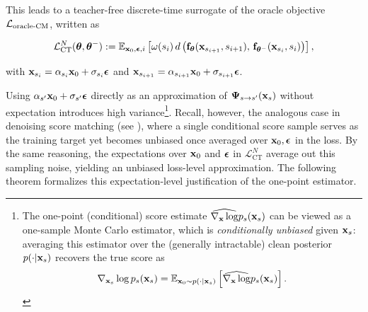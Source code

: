 This leads to a teacher-free discrete-time surrogate of the oracle objective $\mathcal{L}_{\mathrm{oracle}\text{-}\mathrm{CM}}$, written as
\begin{mdframed}
\begin{align}\label{eq:ct-discrete-approx-N}
    \mathcal{L}_{\text{CT}}^N(\bm{\theta}, \bm{\theta}^-) 
    := \mathbb{E}_{{\mathbf{x}}_0, {\bm{\epsilon}}, i} \left[ 
       \omega(s_i)\, d \left({\mathbf{f}}_{\bm{\theta}}({\mathbf{x}}_{s_{i+1}}, s_{i+1}),\, 
       {\mathbf{f}}_{\bm{\theta}^-}({\mathbf{x}}_{s_i}, s_i)\right)
    \right],
\end{align}
\end{mdframed}
with ${\mathbf{x}}_{s_i} = \alpha_{s_i}{\mathbf{x}}_0 + \sigma_{s_i}{\bm{\epsilon}}$ and ${\mathbf{x}}_{s_{i+1}} = \alpha_{s_{i+1}}{\mathbf{x}}_0 + \sigma_{s_{i+1}}{\bm{\epsilon}}$.

Using $\alpha_{s'}{\mathbf{x}}_0+\sigma_{s'}{\bm{\epsilon}}$ directly as an approximation of ${\bm{\Psi}}_{s\to s'}({\mathbf{x}}_s)$ without expectation introduces high variance\footnote{The one-point (conditional) score estimate $\widehat{\nabla_{{\mathbf{x}}}\log}p_s({\mathbf{x}}_s)$ can be viewed as a one-sample Monte Carlo estimator, which is \emph{conditionally unbiased} given ${\mathbf{x}}_s$: averaging this estimator over the (generally intractable) clean posterior $p(\cdot|{\mathbf{x}}_s)$ recovers the true score as
\[
\nabla_{{\mathbf{x}}_s}\log p_s({\mathbf{x}}_s)
= \mathbb{E}_{{\mathbf{x}}_0\sim p(\cdot|{\mathbf{x}}_s)}
 \left[\widehat{\nabla_{{\mathbf{x}}}\log}p_s({\mathbf{x}}_s)\right].
\]}. 
Recall, however, the analogous case in denoising score matching (see ), where a single conditional score sample serves as the training target yet becomes unbiased once averaged over ${\mathbf{x}}_0,{\bm{\epsilon}}$ in the loss. 
By the same reasoning, the expectations over ${\mathbf{x}}_0$ and ${\bm{\epsilon}}$ in $\mathcal{L}_{\mathrm{CT}}^N$ average out this sampling noise, yielding an unbiased loss-level approximation. The following theorem formalizes this expectation-level justification of the one-point estimator.


